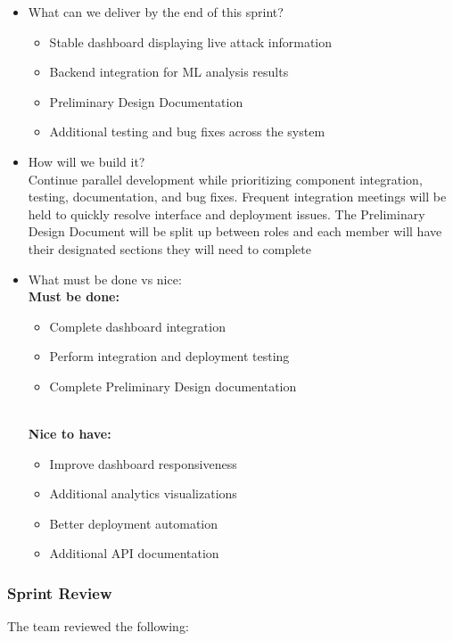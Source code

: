 \documentclass{article}
\begin{document}
\begin{itemize}
    \item What can we deliver by the end of this sprint? 
    
    \begin{itemize}
    \item Stable dashboard displaying live attack information
    \item Backend integration for ML analysis results
    \item Preliminary Design Documentation
    \item Additional testing and bug fixes across the system
    \end{itemize}
   
    \item How will we build it? 
    \\ Continue parallel development while prioritizing component integration, testing, documentation, and bug fixes. Frequent integration meetings will be held to quickly resolve interface and deployment issues. The Preliminary Design Document will be split up between roles and each member will have their designated sections they will need to complete 

  
    \item What must be done vs nice:
    \\\textbf{Must be done:}
    \begin{itemize}
    \item Complete dashboard integration
    \item Perform integration and deployment testing
    \item Complete Preliminary Design documentation
    \end{itemize}
    
    \\\textbf{Nice to have:}
    \begin{itemize}
    \item Improve dashboard responsiveness
    \item Additional analytics visualizations
    \item Better deployment automation
    \item Additional API documentation
    \end{itemize}
    

\end{itemize}

\subsubsection{Sprint Review}
The team reviewed the following:
\end{document}
